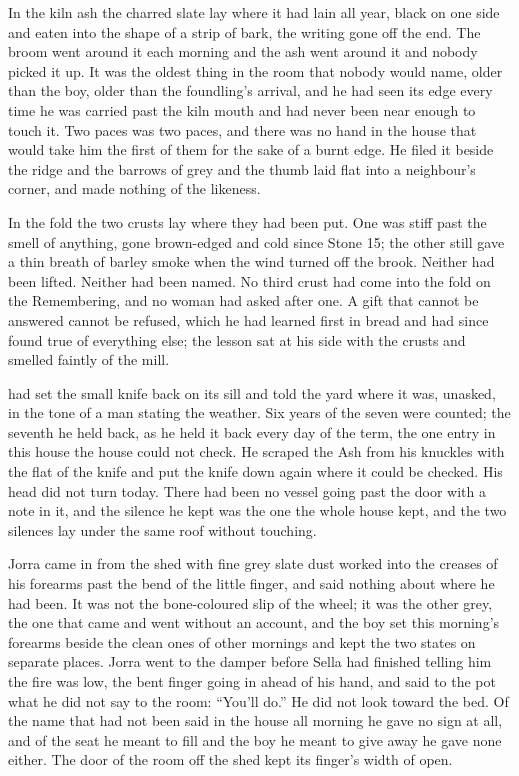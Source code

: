 \scenebreak

In the kiln ash the charred slate lay where it had lain all year, black on one side and eaten into the shape of a strip of bark, the writing gone off the end. The broom went around it each morning and the ash went around it and nobody picked it up. It was the oldest thing in the room that nobody would name, older than the boy, older than the foundling's arrival, and he had seen its edge every time he was carried past the kiln mouth and had never been near enough to touch it. Two paces was two paces, and there was no hand in the house that would take him the first of them for the sake of a burnt edge. He filed it beside the ridge and the barrows of grey and the thumb laid flat into a neighbour's corner, and made nothing of the likeness.

In the fold the two crusts lay where they had been put. One was stiff past the smell of anything, gone brown-edged and cold since Stone 15; the other still gave a thin breath of barley smoke when the wind turned off the brook. Neither had been lifted. Neither had been named. No third crust had come into the fold on the Remembering, and no woman had asked after one. A gift that cannot be answered cannot be refused, which he had learned first in bread and had since found true of everything else; the lesson sat at his side with the crusts and smelled faintly of the mill.

 had set the small knife back on its sill and told the yard where it was, unasked, in the tone of a man stating the weather. Six years of the seven were counted; the seventh he held back, as he held it back every day of the term, the one entry in this house the house could not check. He scraped the Ash from his knuckles with the flat of the knife and put the knife down again where it could be checked. His head did not turn today. There had been no vessel going past the door with a note in it, and the silence he kept was the one the whole house kept, and the two silences lay under the same roof without touching.

Jorra came in from the shed with fine grey slate dust worked into the creases of his forearms past the bend of the little finger, and said nothing about where he had been. It was not the bone-coloured slip of the wheel; it was the other grey, the one that came and went without an account, and the boy set this morning's forearms beside the clean ones of other mornings and kept the two states on separate places. Jorra went to the damper before Sella had finished telling him the fire was low, the bent finger going in ahead of his hand, and said to the pot what he did not say to the room: “You'll do.” He did not look toward the bed. Of the name that had not been said in the house all morning he gave no sign at all, and of the seat he meant to fill and the boy he meant to give away he gave none either. The door of the room off the shed kept its finger's width of open.

